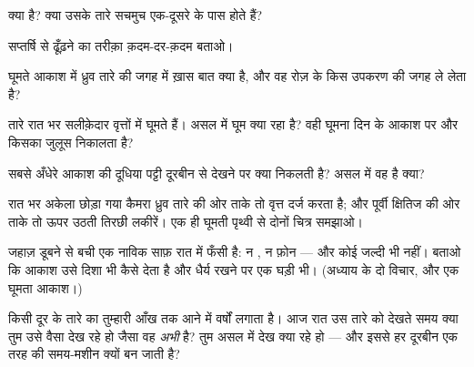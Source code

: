 \begin{exercise}[$\star$]\label{exo:g5:stars-night-sky:4}
 क्या है? क्या उसके तारे सचमुच एक-दूसरे के पास होते हैं?
\end{exercise}

\begin{exercise}[$\star$]\label{exo:g5:stars-night-sky:5}
सप्तर्षि से  ढूँढ़ने का तरीक़ा क़दम-दर-क़दम बताओ।
\end{exercise}

\begin{exercise}[$\star$]\label{exo:g5:stars-night-sky:6}
घूमते आकाश में ध्रुव तारे की जगह में ख़ास बात क्या है, और वह रोज़ के
किस उपकरण की जगह ले लेता है?
\end{exercise}

\begin{exercise}[$\star$]\label{exo:g5:stars-night-sky:7}
तारे रात भर सलीक़ेदार वृत्तों में घूमते हैं। असल में घूम क्या रहा है?
वही घूमना दिन के आकाश पर और किसका जुलूस निकालता है?
\end{exercise}

\begin{exercise}[$\star$]\label{exo:g5:stars-night-sky:8}
सबसे अँधेरे आकाश की दूधिया पट्टी दूरबीन से देखने पर क्या निकलती है?
असल में वह है क्या?
\end{exercise}

\begin{exercise}[$\star\star$]\label{exo:g5:stars-night-sky:9}
रात भर अकेला छोड़ा गया कैमरा ध्रुव तारे की ओर ताके तो वृत्त दर्ज
करता है; और पूर्वी क्षितिज की ओर ताके तो ऊपर उठती तिरछी लकीरें। एक ही
घूमती पृथ्वी से दोनों चित्र समझाओ।
\end{exercise}

\begin{exercise}[$\star\star$]\label{exo:g5:stars-night-sky:10}
जहाज़ डूबने से बची एक नाविक साफ़ रात में फँसी है: न , न फ़ोन
--- और कोई जल्दी भी नहीं। बताओ कि आकाश उसे दिशा भी कैसे देता है और
धैर्य रखने पर एक घड़ी भी। (अध्याय के दो विचार, और एक घूमता आकाश।)
\end{exercise}

\begin{exercise}[$\star\star$]\label{exo:g5:stars-night-sky:11}
किसी दूर के तारे का  तुम्हारी आँख तक आने में वर्षों लगाता है।
आज रात उस तारे को देखते समय क्या तुम उसे वैसा देख रहे हो जैसा वह
\emph{अभी} है? तुम असल में देख क्या रहे हो --- और इससे हर दूरबीन एक
तरह की समय-मशीन क्यों बन जाती है?
\end{exercise}
